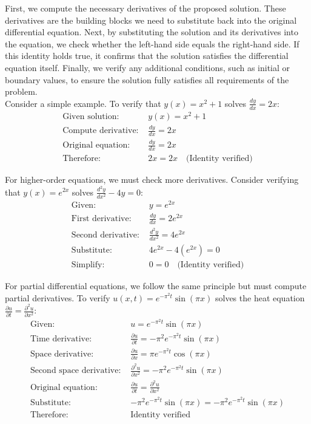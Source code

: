 \noindent First, we compute the necessary derivatives of the proposed solution. These derivatives are the building blocks we need to substitute back into the original differential equation. Next, by substituting the solution and its derivatives into the equation, we check whether the left-hand side equals the right-hand side. If this identity holds true, it confirms that the solution satisfies the differential equation itself. Finally, we verify any additional conditions, such as initial or boundary values, to ensure the solution fully satisfies all requirements of the problem. \\

\noindent Consider a simple example. To verify that $y(x) = x^2 + 1$ solves $\frac{dy}{dx} = 2x$:
\begin{align*}
\text{Given solution: } & y(x) = x^2 + 1 \\
\text{Compute derivative: } & \frac{dy}{dx} = 2x \\
\text{Original equation: } & \frac{dy}{dx} = 2x \\
\text{Therefore: } & 2x = 2x \quad \text{(Identity verified)}
\end{align*}

\noindent For higher-order equations, we must check more derivatives. Consider verifying that $y(x) = e^{2x}$ solves $\frac{d^2y}{dx^2} - 4y = 0$:
\begin{align*}
\text{Given: } & y = e^{2x} \\
\text{First derivative: } & \frac{dy}{dx} = 2e^{2x} \\
\text{Second derivative: } & \frac{d^2y}{dx^2} = 4e^{2x} \\
\text{Substitute: } & 4e^{2x} - 4(e^{2x}) = 0 \\
\text{Simplify: } & 0 = 0 \quad \text{(Identity verified)}
\end{align*}

\noindent For partial differential equations, we follow the same principle but must compute partial derivatives. To verify $u(x,t) = e^{-\pi^2t}\sin(\pi x)$ solves the heat equation $\frac{\partial u}{\partial t} = \frac{\partial^2 u}{\partial x^2}$:
\begin{align*}
\text{Given: } & u = e^{-\pi^2t}\sin(\pi x) \\
\text{Time derivative: } & \frac{\partial u}{\partial t} = -\pi^2e^{-\pi^2t}\sin(\pi x) \\
\text{Space derivative: } & \frac{\partial u}{\partial x} = \pi e^{-\pi^2t}\cos(\pi x) \\
\text{Second space derivative: } & \frac{\partial^2 u}{\partial x^2} = -\pi^2e^{-\pi^2t}\sin(\pi x) \\
\text{Original equation: } & \frac{\partial u}{\partial t} = \frac{\partial^2 u}{\partial x^2} \\
\text{Substitute: } & -\pi^2e^{-\pi^2t}\sin(\pi x) = -\pi^2e^{-\pi^2t}\sin(\pi x) \\
\text{Therefore: } & \text{Identity verified}
\end{align*}

